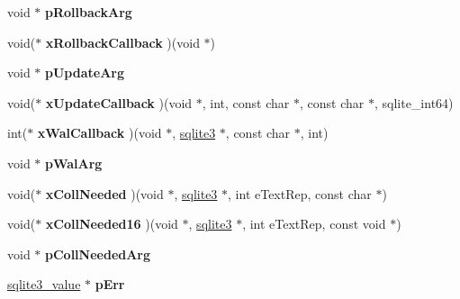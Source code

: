\begin{DoxyCompactItemize}
\item 
void $\ast$ {\bfseries p\+Rollback\+Arg}\hypertarget{structsqlite3_a3215967241f15d4599132a8dc2adfb93}{}\label{structsqlite3_a3215967241f15d4599132a8dc2adfb93}

\item 
void($\ast$ {\bfseries x\+Rollback\+Callback} )(void $\ast$)\hypertarget{structsqlite3_a695c32708202c35cdc35a30ca40e1b6f}{}\label{structsqlite3_a695c32708202c35cdc35a30ca40e1b6f}

\item 
void $\ast$ {\bfseries p\+Update\+Arg}\hypertarget{structsqlite3_ab4269aa44fea9906fe94045336f13d2a}{}\label{structsqlite3_ab4269aa44fea9906fe94045336f13d2a}

\item 
void($\ast$ {\bfseries x\+Update\+Callback} )(void $\ast$, int, const char $\ast$, const char $\ast$, sqlite\+\_\+int64)\hypertarget{structsqlite3_ab562a95a332023d861369ece9591dc3a}{}\label{structsqlite3_ab562a95a332023d861369ece9591dc3a}

\item 
int($\ast$ {\bfseries x\+Wal\+Callback} )(void $\ast$, \hyperlink{structsqlite3}{sqlite3} $\ast$, const char $\ast$, int)\hypertarget{structsqlite3_a19a404745ce0b4f13cb29a445281288d}{}\label{structsqlite3_a19a404745ce0b4f13cb29a445281288d}

\item 
void $\ast$ {\bfseries p\+Wal\+Arg}\hypertarget{structsqlite3_aa75309c2e522cf0f6ccbd7a3c38e1075}{}\label{structsqlite3_aa75309c2e522cf0f6ccbd7a3c38e1075}

\item 
void($\ast$ {\bfseries x\+Coll\+Needed} )(void $\ast$, \hyperlink{structsqlite3}{sqlite3} $\ast$, int e\+Text\+Rep, const char $\ast$)\hypertarget{structsqlite3_a3312d02b28a6743f2f703d363c7c4f9b}{}\label{structsqlite3_a3312d02b28a6743f2f703d363c7c4f9b}

\item 
void($\ast$ {\bfseries x\+Coll\+Needed16} )(void $\ast$, \hyperlink{structsqlite3}{sqlite3} $\ast$, int e\+Text\+Rep, const void $\ast$)\hypertarget{structsqlite3_a531dea6bd5cf5f13a8f17c66bf66ac92}{}\label{structsqlite3_a531dea6bd5cf5f13a8f17c66bf66ac92}

\item 
void $\ast$ {\bfseries p\+Coll\+Needed\+Arg}\hypertarget{structsqlite3_addbc9c709cc728968132af5487d5c30c}{}\label{structsqlite3_addbc9c709cc728968132af5487d5c30c}

\item 
\hyperlink{structMem}{sqlite3\+\_\+value} $\ast$ {\bfseries p\+Err}\hypertarget{structsqlite3_a90941a0c05641f623c257a7a65b22809}{}\label{structsqlite3_a90941a0c05641f623c257a7a65b22809}


\end{DoxyCompactItemize}
